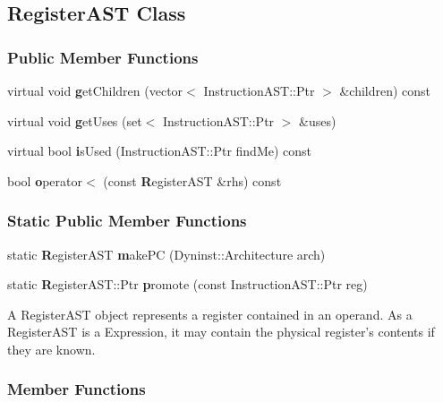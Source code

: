 \subsection{RegisterAST Class}
\label{classDyninst_1_1InstructionAPI_1_1RegisterAST}
\subsubsection*{Public Member Functions}
\begin{DoxyCompactItemize}
\item 
virtual void {\textbf getChildren} (vector$<$ InstructionAST::Ptr $>$ \&children) const 
\item 
virtual void {\textbf getUses} (set$<$ InstructionAST::Ptr $>$ \&uses)
\item 
virtual bool {\textbf isUsed} (InstructionAST::Ptr findMe) const 
\item 
bool {\textbf operator$<$} (const {\textbf RegisterAST} \&rhs) const 
\end{DoxyCompactItemize}
\subsubsection*{Static Public Member Functions}
\begin{DoxyCompactItemize}
\item 
static {\textbf RegisterAST} {\textbf makePC} (Dyninst::Architecture arch)
\item 
static {\textbf RegisterAST::Ptr} {\textbf promote} (const InstructionAST::Ptr reg)
\end{DoxyCompactItemize}



A RegisterAST object represents a register contained in an operand. As a RegisterAST is a Expression, it may contain the physical register's contents if they are known. 

\subsubsection{Member Functions}
